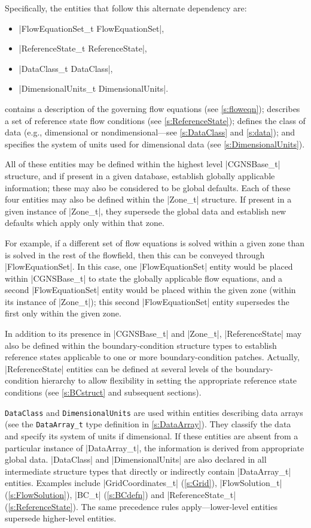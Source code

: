 Specifically, the entities that follow this alternate dependency are:
\begin{itemize}
\item |FlowEquationSet_t FlowEquationSet|,
\item |ReferenceState_t ReferenceState|,
\item |DataClass_t DataClass|,
\item |DimensionalUnits_t DimensionalUnits|.
\end{itemize}
 contains a description of the governing flow
equations (see \autoref{s:floweqn});  describes a
set of reference state flow conditions (see \autoref{s:ReferenceState});
 defines the class of data (e.g., dimensional or
nondimensional---see \autoref{s:DataClass} and \autoref{s:data}); and
 specifies the system of units used for
dimensional data (see \autoref{s:DimensionalUnits}).

All of these entities may be defined within the highest level |CGNSBase_t|
structure, and if present in a given database, establish globally applicable
information; these may also be considered to be global defaults.  Each of
these four entities may also be defined within the |Zone_t| structure.  If
present in a given instance of |Zone_t|, they supersede the global data and
establish new defaults which apply only within that zone.

For example, if a different set of flow equations is solved within a
given zone than is solved in the rest of the flowfield, then this can be
conveyed through |FlowEquationSet|.
In this case, one |FlowEquationSet| entity would be placed within
|CGNSBase_t| to state the globally applicable flow equations, and a second
|FlowEquationSet| entity would be placed within the given zone (within its
instance of |Zone_t|); this second |FlowEquationSet| entity supersedes the
first only within the given zone.

In addition to its presence in |CGNSBase_t| and |Zone_t|,
|ReferenceState| may also be defined within the boundary-condition
structure types to establish reference states applicable to one or more
boundary-condition patches.  Actually, |ReferenceState| entities can be
defined at several levels of the boundary-condition hierarchy to allow
flexibility in setting the appropriate reference state conditions (see
\autoref{s:BCstruct} and subsequent sections).

\texttt{DataClass} and \texttt{DimensionalUnits} are used within
entities describing data arrays (see the \texttt{DataArray\_t} type
definition in \autoref{s:DataArray}).
They classify the data and specify its system of units if dimensional.  If
these entities are absent from a particular instance of |DataArray_t|, the
information is derived from appropriate global data.  |DataClass| and
|DimensionalUnits| are also declared in all intermediate structure types that
directly or indirectly contain |DataArray_t| entities.  Examples include
|GridCoordinates_t| (\autoref{s:Grid}), |FlowSolution_t|
(\autoref{s:FlowSolution}), |BC_t| (\autoref{s:BCdefn}) and |ReferenceState_t|
(\autoref{s:ReferenceState}).  The same precedence rules apply---lower-level
entities supersede higher-level entities.

